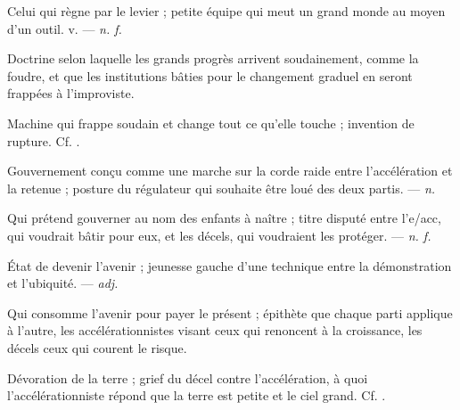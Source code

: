  Celui qui règne par le levier ; petite équipe qui meut un grand monde au moyen d'un outil.   v. ---  \textit{n. f.}

 Doctrine selon laquelle les grands progrès arrivent soudainement, comme la foudre, et que les institutions bâties pour le changement graduel en seront frappées à l'improviste.

 Machine qui frappe soudain et change tout ce qu'elle touche ; invention de rupture. Cf. .

 Gouvernement conçu comme une marche sur la corde raide entre l'accélération et la retenue ; posture du régulateur qui souhaite être loué des deux partis. ---  \textit{n.}

 Qui prétend gouverner au nom des enfants à naître ; titre disputé entre l'e/acc, qui voudrait bâtir pour eux, et les décels, qui voudraient les protéger. ---  \textit{n. f.}

 État de devenir l'avenir ; jeunesse gauche d'une technique entre la démonstration et l'ubiquité.  ---  \textit{adj.}

  Qui consomme l'avenir pour payer le présent ; épithète que chaque parti applique à l'autre, les accélérationnistes visant ceux qui renoncent à la croissance, les décels ceux qui courent le risque.

  Dévoration de la terre ; grief du décel contre l'accélération, à quoi l'accélérationniste répond que la terre est petite et le ciel grand. Cf. .

